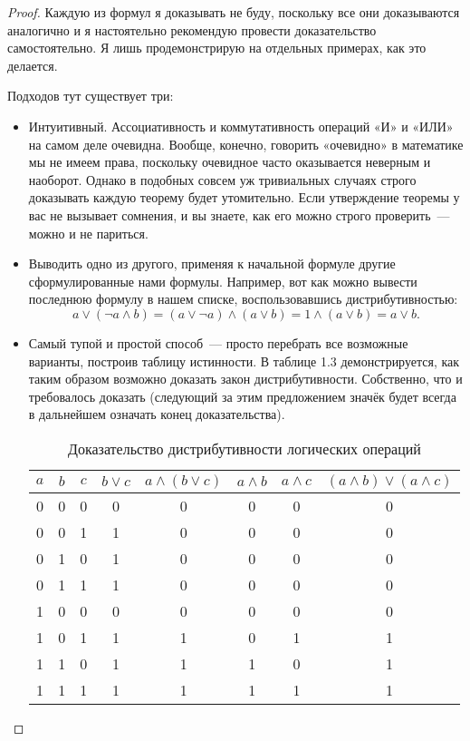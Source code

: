 \begin{proof}
Каждую из формул я доказывать не буду, поскольку все они доказываются аналогично и я настоятельно рекомендую провести доказательство самостоятельно. Я лишь продемонстрирую на отдельных примерах, как это делается.

Подходов тут существует три:
\begin{itemize}
\item Интуитивный. Ассоциативность и коммутативность операций «И» и «ИЛИ» на самом деле очевидна. Вообще, конечно, говорить «очевидно» в математике мы не имеем права, поскольку очевидное часто оказывается неверным и наоборот. Однако в подобных совсем уж тривиальных случаях строго доказывать каждую теорему будет утомительно. Если утверждение теоремы у вас не вызывает сомнения, и вы знаете, как его можно строго проверить~--- можно и не париться.
\item Выводить одно из другого, применяя к начальной формуле другие сформулированные нами формулы. Например, вот как можно вывести последнюю формулу в нашем списке, воспользовавшись дистрибутивностью:
$$
a \lor (\neg a \land b) = (a \lor \neg a) \land (a \lor b) = 1 \land (a \lor b) = a \lor b.
$$

\item Самый тупой и простой способ~--- просто перебрать все возможные варианты, построив таблицу истинности. В таблице 1.3 демонстрируется, как таким образом возможно доказать закон дистрибутивности. Собственно, что и требовалось доказать (следующий за этим предложением значёк будет всегда в дальнейшем означать конец доказательства).

\begin{table}[h]
\centering
\begin{tabular}{ccc|cc|ccc}
$a$&$b$&$c$&$b\lor c$&$a\land(b\lor c)$&$a\land b$&$a\land c$&$(a\land b)\lor(a\land c)$\\
\hline
0&0&0&0&0&0&0&0\\
0&0&1&1&0&0&0&0\\
0&1&0&1&0&0&0&0\\
0&1&1&1&0&0&0&0\\
1&0&0&0&0&0&0&0\\
1&0&1&1&1&0&1&1\\
1&1&0&1&1&1&0&1\\
1&1&1&1&1&1&1&1
\end{tabular}
\caption{Доказательство дистрибутивности логических операций}
\end{table}

\end{itemize}
\end{proof}

